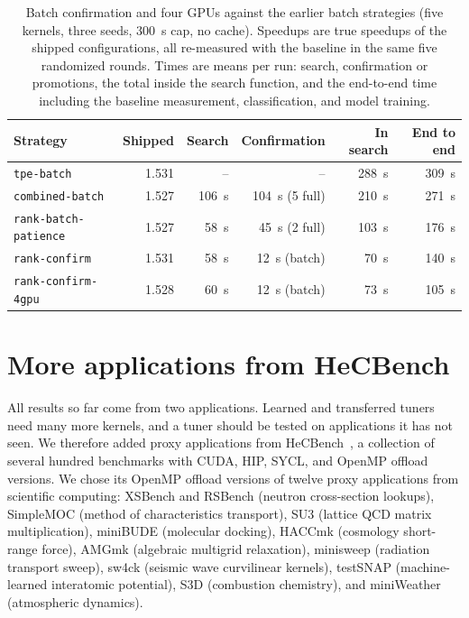 \documentclass[10pt]{article}
\newcommand{\code}[1]{\texttt{#1}}
\begin{document}
\begin{table}[t]
\centering
\caption{Batch confirmation and four GPUs against the earlier batch strategies
(five kernels, three seeds, 300~s cap, no cache). Speedups are true speedups
of the shipped configurations, all re-measured with the baseline in the same
five randomized rounds. Times are means per run: search, confirmation or
promotions, the total inside the search function, and the end-to-end time
including the baseline measurement, classification, and model training.}
\label{tab:confirm}
\small
\setlength{\tabcolsep}{4pt}
\begin{tabular}{lrrrrr}
\toprule
Strategy & Shipped & Search & Confirmation & In search & End to end \\
\midrule
\code{tpe-batch} & 1.531 & -- & -- & 288~s & 309~s \\
\code{combined-batch} & 1.527 & 106~s & 104~s (5 full) & 210~s & 271~s \\
\code{rank-batch-patience} & 1.527 & 58~s & 45~s (2 full) & 103~s & 176~s \\
\code{rank-confirm} & 1.531 & 58~s & 12~s (batch) & 70~s & 140~s \\
\code{rank-confirm-4gpu} & 1.528 & 60~s & 12~s (batch) & 73~s & 105~s \\
\bottomrule
\end{tabular}
\end{table}

\section{More applications from HeCBench}
\label{sec:hecbench}

All results so far come from two applications. Learned and transferred
tuners need many more kernels, and a tuner should be tested on applications
it has not seen. We therefore added proxy applications from
HeCBench~\cite{jin2023hecbench}, a collection of several hundred benchmarks with
CUDA, HIP, SYCL, and OpenMP offload versions. We chose its OpenMP offload
versions of twelve proxy applications from scientific computing: XSBench and
RSBench (neutron cross-section lookups), SimpleMOC (method of characteristics
transport), SU3 (lattice QCD matrix multiplication), miniBUDE (molecular
docking), HACCmk (cosmology short-range force), AMGmk (algebraic multigrid
relaxation), minisweep (radiation transport sweep), sw4ck (seismic wave
curvilinear kernels), testSNAP (machine-learned interatomic potential), S3D
(combustion chemistry), and miniWeather (atmospheric dynamics).
\end{document}
